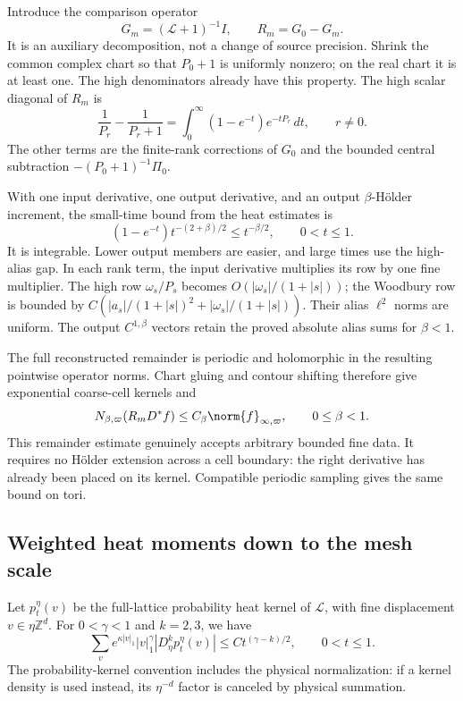 Introduce the comparison operator
\begin{equation}\label{rd-massive-split}
 G_m=(\mathcal L+1)^{-1}I,\qquad R_m=G_0-G_m.
\end{equation}
It is an auxiliary decomposition, not a change of source precision.
Shrink the common complex chart so that $P_0+1$ is uniformly nonzero;
on the real chart it is at least one. The high denominators already
have this property. The high scalar diagonal of $R_m$ is
\begin{equation}\label{rd-high-remainder}
 \frac1{P_r}-\frac1{P_r+1}
    =\int_0^\infty(1-e^{-t})e^{-tP_r}\,dt,
                    \qquad r\ne0.
\end{equation}
The other terms are the finite-rank corrections of $G_0$ and the
bounded central subtraction $-(P_0+1)^{-1}\Pi_0$.

With one input derivative, one output derivative, and an output
$\beta$-H\"older increment, the small-time bound from the heat
estimates is
\[
 (1-e^{-t})t^{-(2+\beta)/2}\le t^{-\beta/2},
                       \qquad0<t\le1.
\]
It is integrable. Lower output members are easier, and large times
use the high-alias gap. In each rank term, the input derivative
multiplies its row by one fine multiplier. The high row
$\omega_s/P_s$ becomes $O(|\omega_s|/(1+|s|))$; the Woodbury row
is bounded by
$C(|a_s|/(1+|s|)^2+|\omega_s|/(1+|s|))$.
Their alias $\ell^2$ norms are uniform. The output
$C^{1,\beta}$ vectors retain the proved absolute alias sums for
$\beta<1$.

The full reconstructed remainder is periodic and holomorphic in
the resulting pointwise operator norms. Chart gluing and contour
shifting therefore give exponential coarse-cell kernels and
\begin{equation}\label{rd-remainder-bound}
 N_{\beta,\varpi}(R_mD^*f)
                  \le C_\beta\norm{f}_{\infty,\varpi},
                       \qquad0\le\beta<1.
\end{equation}
This remainder estimate genuinely accepts arbitrary bounded fine
data. It requires no H\"older extension across a cell boundary:
the right derivative has already been placed on its kernel.
Compatible periodic sampling gives the same bound on tori.

\subsection{Weighted heat moments down to the mesh scale}

Let $p_t^\eta(v)$ be the full-lattice probability heat kernel of
$\mathcal L$, with fine displacement $v\in\eta\mathbb Z^d$.
For $0<\gamma<1$ and $k=2,3$, we have
\begin{equation}\label{rd-heat-moment}
 \sum_v e^{\kappa|v|_1}|v|_1^\gamma
                   |D_\eta^kp_t^\eta(v)|
       \le Ct^{(\gamma-k)/2},\qquad0<t\le1.
\end{equation}
The probability-kernel convention includes the physical normalization:
if a kernel density is used instead, its $\eta^{-d}$ factor is
canceled by physical summation.

